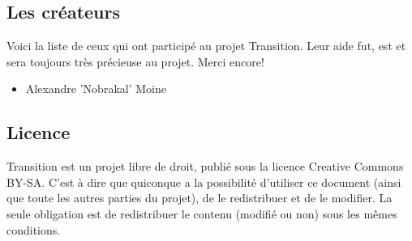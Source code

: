 \documentclass{book}
\begin{document}
\subsection{Les créateurs}
Voici la liste de ceux qui ont participé au projet Transition. Leur aide fut, est et sera toujours très précieuse au projet. Merci encore!  
\begin{itemize}
\item Alexandre ’Nobrakal’ Moine 
\end{itemize}
\subsection{Licence}
Transition est un projet libre de droit, publié sous la licence Creative Commons BY-SA. C'est à dire que quiconque a la possibilité d'utiliser ce document (ainsi que toute les autres parties du projet), de le redistribuer et de le modifier. La seule obligation est de redistribuer le contenu (modifié ou non) sous les mêmes conditions.
\end{document}
